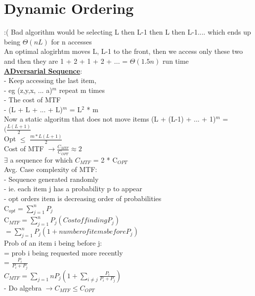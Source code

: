 \documentclass[12pt]{article}
\newcommand{\myt}[1]{\textbf{\underline{#1}}}
\begin{document}
	\section*{Dynamic Ordering}
	:(
	Bad algorithm would be selecting L then L-1 then L then L-1.... which ends up being $\Theta(nL)$ for n accesses\\
	An optimal alogirhtm moves L, L-1 to the front, then we access only these two and then they are 1 + 2 + 1 + 2 + ... = $\Theta(1.5n)$ run time\\
	
	\myt{ADversarial Sequence}:\\
	- Keep accessing the last item, \\
	- eg (z,y,x, ... a)$^m$ repeat m times\\
	- The cost of MTF\\
	 - (L + L + ... + L)$^m$ = L$^2$ * m\\
	 
	 Now a static algoritm that does not move items (L + (L-1) + ... + 1)$^m$ = $(\frac{L(L+1)}{2}$\\
	 Opt $\leq$ $\frac{m*L(L+1)}{2}$\\
	 
	 Cost of MTF $\rightarrow \frac{C_{MTF}}{C_{OPT}} \approx 2$\\
	 $\exists$ a sequence for which $C_{MTF}$ = 2 * C$_{OPT}$\\
	 
	 Avg. Case complexity of MTF:\\
	 - Sequence generated randomly\\
	 - ie. each item j has a probability p to appear\\
	 - opt orders item is decreasing order of probabilities\\
	 C$_{opt} = \sum_{j=1}^{n}P_j$\\
	 C$_{MTF} = \sum_{j=1}^{n}P_j(Cost of finding P_j)$\\
	 $= \sum_{j=1}^{n}P_j (1 + number of items before P_j)$\\
	 Prob of an item i being before j:\\
	 = prob i being requested more recently\\
	 = $\frac{P_i}{P_i+P_j}$\\
	 
	 $C_{MTF} = \sum_{j=1}{n}P_j(1 + \sum_{i\neq j}\frac{P_i}{P_i+P_j})$\\
	 - Do algebra $\rightarrow C_{MTF} \leq C_{OPT}$\\
	 
\end{document}
